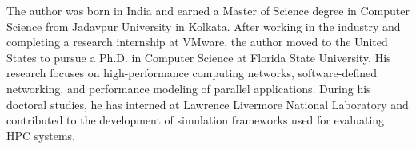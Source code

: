\documentclass[11pt,expanded,copyright]{fsuthesis}
\begin{document}
\renewcommand*{\bibname}{References}



\printbibliography





%

\begin{biosketch}
The author was born in India and earned a Master of Science degree in Computer Science from Jadavpur University in Kolkata. After working in the industry and completing a research internship at VMware, the author moved to the United States to pursue a Ph.D. in Computer Science at Florida State University. His research focuses on high-performance computing networks, software-defined networking, and performance modeling of parallel applications. During his doctoral studies, he has interned at Lawrence Livermore National Laboratory and contributed to the development of simulation frameworks used for evaluating HPC systems.
\end{biosketch}

\end{document}
